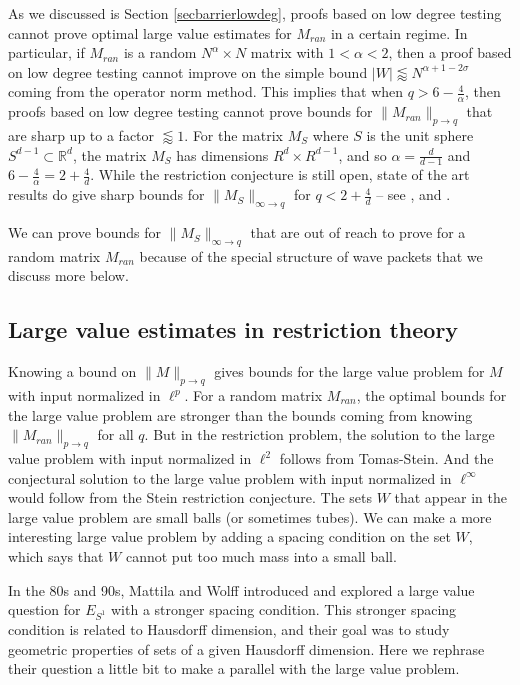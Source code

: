 \documentclass{amsart}
\newcommand{\RR}{\mathbb{R}}
\begin{document}
As we discussed is Section \ref{secbarrierlowdeg},  proofs based on low degree testing cannot prove optimal large value estimates for $M_{ran}$ in a certain regime.   In particular,  if $M_{ran}$ is a random $N^\alpha \times N$ matrix with $1 < \alpha < 2$,  then a proof based on low degree testing cannot improve on the simple bound $|W| \lessapprox N^{\alpha + 1 - 2 \sigma}$ coming from the operator norm method.   This implies that when $q > 6 - \frac{4}{\alpha}$,  then proofs based on low degree testing cannot prove bounds for $\| M_{ran} \|_{p \rightarrow q}$ that are sharp up to a factor $\lessapprox 1$.   For the matrix $M_S$ where $S$ is the unit sphere $S^{d-1} \subset \RR^d$,  the matrix $M_S$ has dimensions $R^d \times R^{d-1}$,  and so $\alpha = \frac{d}{d-1}$ and $6 - \frac{4}{\alpha} = 2 + \frac{4}{d}$.   While the restriction conjecture is still open,  state of the art results do give sharp bounds for $\| M_S \|_{\infty \rightarrow q}$ for $q < 2 + \frac{4}{d}$ -- see \cite{BG},  \cite{HR} and \cite{HZ}.

We can prove bounds for $\| M_S \|_{\infty \rightarrow q}$ that are out of reach to prove for a random matrix $M_{ran}$ because of the special structure of wave packets that we discuss more below. 






\subsection{Large value estimates in restriction theory}

Knowing a bound on $\| M \|_{p \rightarrow q}$ gives bounds for the large value problem for $M$ with input normalized in $\ell^p$.  For a random matrix $M_{ran}$, the optimal bounds for the large value problem are stronger than the bounds coming from knowing $\| M_{ran} \|_{p \rightarrow q}$ for all $q$.  But in the restriction problem, the solution to the large value problem with input normalized in $\ell^2$ follows from Tomas-Stein.  And the conjectural solution to the large value problem with input normalized in $\ell^\infty$ would follow from the Stein restriction conjecture.  The sets $W$ that appear in the large value problem are small balls (or sometimes tubes).  We can make a more interesting large value problem by adding a spacing condition on the set $W$,  which says that $W$ cannot put too much mass into a small ball.  

In the 80s and 90s, Mattila and Wolff introduced and explored a large value question for $E_{S^1}$ with a stronger spacing condition.  This stronger spacing condition is related to Hausdorff dimension, and their goal was to study geometric properties of sets of a given Hausdorff dimension.  Here we rephrase their question a little bit to make a parallel with the large value problem.
\end{document}
